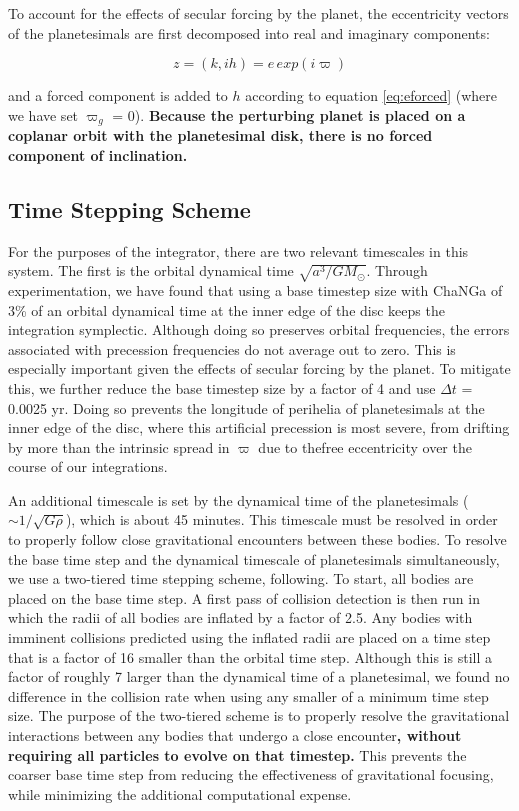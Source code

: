 To account for the effects of secular forcing by the planet, the eccentricity vectors of the planetesimals are first decomposed into 
real and imaginary components:

\begin{equation}\label{eq:kh}
	z = (k, ih) = e \, exp(i \varpi)
\end{equation}

\noindent and a forced component is added to $h$ according to equation \ref{eq:eforced} (where we have set $\varpi_{g}$ = 0). \textbf{Because the perturbing planet is placed on a coplanar orbit with the planetesimal disk, there is no forced component of inclination.}

\subsection{Time Stepping Scheme}\label{sec:timestep}

For the purposes of the integrator, there are two relevant timescales in this system. The first is the orbital dynamical time 
$\sqrt{a^3/G M_{\odot}}$. Through experimentation, we have found that using a base timestep size with {\sc ChaNGa} of 3\% of 
an orbital dynamical time at the inner edge of the disc keeps the integration symplectic. Although doing so preserves orbital 
frequencies, the errors associated with precession frequencies do not average out to zero. This is especially important given the 
effects of secular forcing by the planet. To mitigate this, we further reduce the base timestep size by a factor of 4 and use $\Delta 
t$ = 0.0025 yr. Doing so prevents the longitude of perihelia of planetesimals at the inner edge of the disc, where this artificial 
precession is most severe, from drifting by more than the intrinsic spread in $\varpi$ due to thefree eccentricity over the course 
of our integrations.

An additional timescale is set by the dynamical time of the planetesimals ($\sim 1/\sqrt{G \rho}$), which is about 45 minutes. This 
timescale must be resolved in order to properly follow close gravitational encounters between these bodies. To resolve the base 
time step and the dynamical timescale of planetesimals simultaneously, we use a two-tiered time stepping scheme, 
following\cite{leinhardt15}. To start, all bodies are placed on the base time step. A first pass of collision detection is then run in 
which the radii of all bodies are inflated by a factor of 2.5. Any bodies with imminent collisions predicted using the inflated radii 
are placed on a time step that is a factor of 16 smaller than the orbital time step. Although this is still a factor of roughly 7 larger 
than the dynamical time of a planetesimal, we found no difference in the collision rate when using any smaller of a minimum time 
step size. The purpose of the two-tiered scheme is to properly resolve the gravitational interactions between any bodies that 
undergo a close encounter\textbf{, without requiring all particles to evolve on that timestep.} This prevents the coarser base time step 
from reducing the effectiveness of gravitational focusing, while minimizing the additional computational expense.

